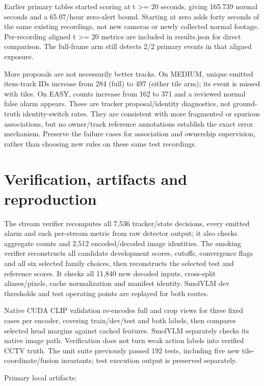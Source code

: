 \documentclass[10pt,a4paper]{article}
\begin{document}
Earlier primary tables started scoring at t >= 20 seconds, giving 165.739 normal seconds and a 65.07/hour zero-alert bound. Starting at zero adds forty seconds of the same existing recordings, not new cameras or newly collected normal footage. Per-recording aligned t >= 20 metrics are included in results.json for direct comparison. The full-frame arm still detects 2/2 primary events in that aligned exposure.

More proposals are not necessarily better tracks. On MEDIUM, unique emitted item-track IDs increase from 284 (full) to 497 (either tile arm); its event is missed with tiles. On EASY, counts increase from 162 to 371 and a reviewed normal false alarm appears. These are tracker proposal/identity diagnostics, not ground-truth identity-switch rates. They are consistent with more fragmented or spurious associations, but no owner/track reference annotations establish the exact error mechanism. Preserve the failure cases for association and ownership supervision, rather than choosing new rules on these same test recordings.

\section{Verification, artifacts and reproduction}

The stream verifier recomputes all 7,536 tracker/state decisions, every emitted alarm and each per-stream metric from raw detector output; it also checks aggregate counts and 2,512 encoded/decoded image identities. The smoking verifier reconstructs all candidate development scores, cutoffs, convergence flags and all six selected family choices, then reconstructs the selected test and reference scores. It checks all 11,840 new decoded inputs, cross-split aliases/pixels, cache normalization and manifest identity. SmolVLM dev thresholds and test operating points are replayed for both routes.

Native CUDA CLIP validation re-encodes full and crop views for three fixed cases per encoder, covering train/dev/test and both labels, then compares selected head margins against cached features. SmolVLM separately checks its native image path. Verification does not turn weak action labels into verified CCTV truth. The unit suite previously passed 192 tests, including five new tile-coordinate/fusion invariants; test execution output is preserved separately.

Primary local artifacts:
\end{document}
